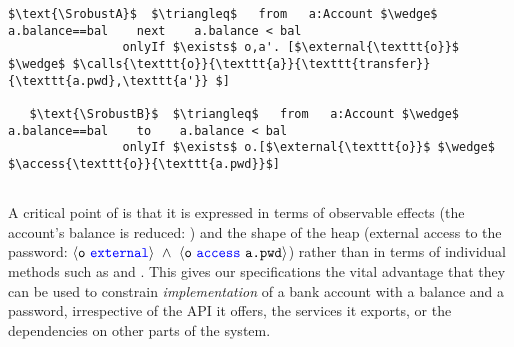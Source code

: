 %
%
%
%
%
%
\begin{lstlisting}[language = Chainmail, mathescape=true, frame=lines]
   $\text{\SrobustA}$  $\triangleq$   from   a:Account $\wedge$ a.balance==bal    next    a.balance < bal
                onlyIf $\exists$ o,a'. [$\external{\texttt{o}}$ $\wedge$ $\calls{\texttt{o}}{\texttt{a}}{\texttt{transfer}}{\texttt{a.pwd},\texttt{a'}} $]    
                
   $\text{\SrobustB}$  $\triangleq$   from   a:Account $\wedge$ a.balance==bal    to    a.balance < bal
                onlyIf $\exists$ o.[$\external{\texttt{o}}$ $\wedge$ $\access{\texttt{o}}{\texttt{a.pwd}}$]    
           
\end{lstlisting}
%
%
% 


A critical point of \SrobustB %
is that it is
expressed in terms of observable effects (the account's balance is
reduced: ) and the shape of the heap 
(external access to the password:
$\external{\prg{o}}\ \wedge\ \access{\prg{o}}{\prg{a.pwd}}$) 
rather than in terms of individual methods such as
 and .
This gives our specifications the
vital advantage that they can be used to constrain
\textit{implementation} of a bank account with a balance and a
password, irrespective of the API it
offers, the services it exports, or the dependencies on other parts of
the system.

